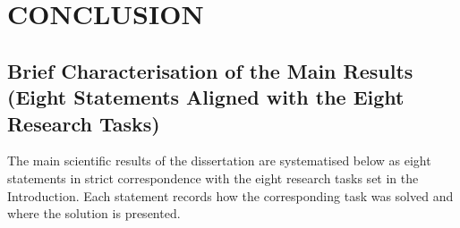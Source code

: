 
\chapter*{CONCLUSION}

\section*{Brief Characterisation of the Main Results
(Eight Statements Aligned with the Eight Research Tasks)}

The main scientific results of the dissertation are systematised
below as eight statements in strict correspondence with the eight
research tasks set in the Introduction. Each statement records
how the corresponding task was solved and where the solution is
presented.

